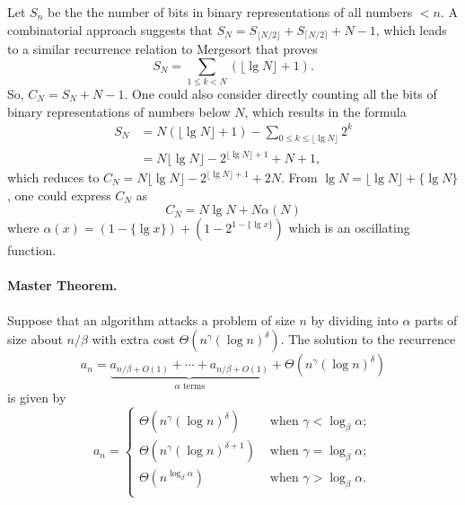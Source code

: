 \documentclass{article}
\begin{document}
Let $S_n$ be the the number of bits in binary representations of all numbers $<
n$. A combinatorial approach suggests that $S_N = S_{\lfloor N/2 \rfloor} +
S_{\lceil N/2 \rceil} + N - 1$, which leads to a similar recurrence relation to
Mergesort that proves \begin{equation*}
  S_N = \sum_{1 \leq k < N}(\lfloor \lg{N} \rfloor + 1).
\end{equation*} So, $C_N = S_N + N - 1$. One could also consider directly
counting all the bits of binary representations of numbers below $N$, which
results in the formula \begin{align*}
  S_N &= N(\lfloor \lg{N} \rfloor + 1) - \sum_{0 \leq k \leq \lfloor \lg{N}
    \rfloor} 2^k \\
    &= N\lfloor \lg{N} \rfloor - 2^{\lfloor \lg{N} \rfloor + 1} + N + 1,
\end{align*} which reduces to $C_N = N\lfloor \lg{N} \rfloor - 2^{\lfloor
\lg{N} \rfloor + 1} + 2N$. From $\lg{N} = \lfloor \lg{N} \rfloor + \{\lg{N}\}$,
one could express $C_N$ as \begin{equation*}
  C_N = N\lg{N} + N\alpha(N)
\end{equation*} where $\alpha(x) = (1 - \{\lg{x}\}) + (1 - 2^{1 -
\{\lg{x}\}})$ which is an oscillating function.

\paragraph{Master Theorem.} Suppose that an algorithm attacks a problem of size
$n$ by dividing into $\alpha$ parts of size about $n/\beta$ with extra cost
$\Theta(n^{\gamma}(\log{n})^{\delta})$. The solution to the recurrence
\begin{equation}
  a_n = \underbrace{a_{n/\beta + O(1)} + \cdots + a_{n/\beta + O(1)}}_{\alpha
    \text{ terms}} + \Theta(n^{\gamma}(\log{n})^{\delta})
\end{equation} is given by \begin{equation}
  a_n = \begin{cases}
    \Theta(n^{\gamma}(\log{n})^{\delta}) &\text{ when } \gamma <
      \log_{\beta}{\alpha}; \\
    \Theta(n^{\gamma}(\log{n})^{\delta + 1}) &\text{ when } \gamma =
      \log_{\beta}{\alpha}; \\
    \Theta(n^{\log_{\beta}{\alpha}}) &\text{ when } \gamma >
      \log_{\beta}{\alpha}. \\
  \end{cases}
\end{equation}
\end{document}
